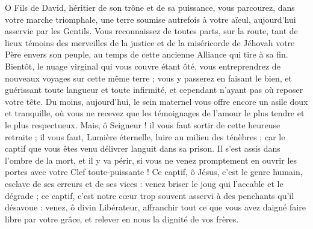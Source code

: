 \documentclass[%
fontsize=10%
,a6paper%
,DIV=15%
]{scrartcl}
\begin{document}

O Fils de David, héritier de son trône et de sa puissance, vous parcourez, dans votre marche triomphale, une terre soumise autrefois à votre aïeul, aujourd’hui asservie par les Gentils. Vous reconnaissez de toutes parts, sur la route, tant de lieux témoins des merveilles de la justice et de la miséricorde de Jéhovah votre Père envers son peuple, au temps de cette ancienne Alliance qui tire à sa fin. Bientôt, le nuage virginal qui vous couvre étant ôté, vous entreprendrez de nouveaux voyages sur cette même terre ; vous y passerez en faisant le bien, et guérissant toute langueur et toute infirmité, et cependant n’ayant pas où reposer votre tête. Du moins, aujourd’hui, le sein maternel vous offre encore un asile doux et tranquille, où vous ne recevez que les témoignages de l’amour le plus tendre et le plus respectueux. Mais, ô Seigneur ! il vous faut sortir de cette heureuse retraite ; il vous faut, Lumière éternelle, luire au milieu des ténèbres ; car le captif que vous êtes venu délivrer languit dans sa prison. Il s’est assis dans l’ombre de la mort, et il y va périr, si vous ne venez promptement en ouvrir les portes avec votre Clef toute-puissante ! Ce captif, ô Jésus, c’est le genre humain, esclave de ses erreurs et de ses vices : venez briser le joug qui l’accable et le dégrade ; ce captif, c’est notre cœur trop souvent asservi à des penchants qu’il désavoue : venez, ô divin Libérateur, affranchir tout ce que vous avez daigné faire libre par votre grâce, et relever en nous la dignité de vos frères.

\end{document}

